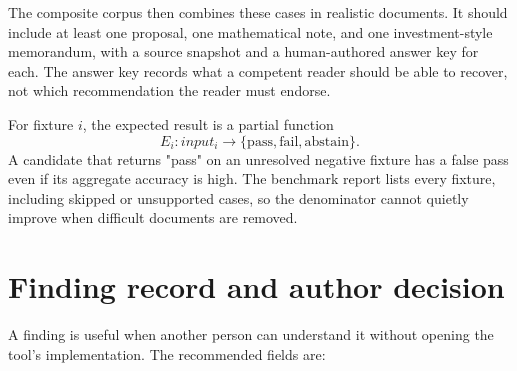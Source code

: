 The composite corpus then combines these cases in realistic documents. It
should include at least one proposal, one mathematical note, and one
investment-style memorandum, with a source snapshot and a human-authored answer
key for each. The answer key records what a competent reader should be able to
recover, not which recommendation the reader must endorse.

For fixture $i$, the expected result is a partial function
\begin{equation}
  E_i: input_i \longrightarrow
  \{\mathrm{pass},\mathrm{fail},\mathrm{abstain}\}.
  \label{eq:manual-fixture-result}
\end{equation}
A candidate that returns "pass" on an unresolved negative fixture has a false
pass even if its aggregate accuracy is high. The benchmark report lists every
fixture, including skipped or unsupported cases, so the denominator cannot
quietly improve when difficult documents are removed.

\section{Finding record and author decision}
\label{sec:manual-finding-record}

A finding is useful when another person can understand it without opening the
tool's implementation. The recommended fields are:

